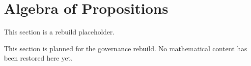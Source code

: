 \section{Algebra of Propositions}

\begin{tcolorbox}[colback=gray!6, colframe=gray!40, arc=2pt,
  left=6pt, right=6pt, top=4pt, bottom=4pt,
  title={\small\textbf{Algebra Toolkit - Planned}},
  fonttitle=\small\bfseries]
This section is a rebuild placeholder.
\end{tcolorbox}

This section is planned for the governance rebuild. No mathematical content has
been restored here yet.
